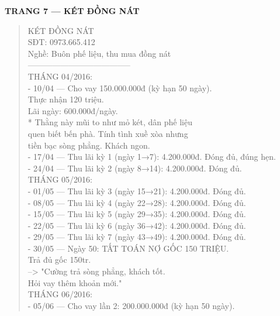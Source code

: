 \documentclass[12pt,a4paper]{article}
\begin{document}
\vspace{0.35cm}\noindent\textbf{\large TRANG 7 — KÉT ĐỒNG NÁT}\\[0.15cm]



\begin{quote}
\fontsize{9pt}{11pt}\selectfont\ttfamily
KÉT ĐỒNG NÁT\\
SĐT: 0973.665.412\\
Nghề: Buôn phế liệu, thu mua đồng nát\\
--------------------------------------\\
\vspace{0.2cm}
THÁNG 04/2016:\\
- 10/04 --- Cho vay 150.000.000đ (kỳ hạn 50 ngày).\\
          Thực nhận 120 triệu.\\
          Lãi ngày: 600.000đ/ngày.\\
          * Thằng này mũi to như mỏ két, dân phế liệu\\
            quen biết bến phà. Tính tình xuề xòa nhưng\\
            tiền bạc sòng phẳng. Khách ngon.\\
\vspace{0.2cm}
- 17/04 --- Thu lãi kỳ 1 (ngày 1→7): 4.200.000đ. Đóng đủ, đúng hẹn.\\
- 24/04 --- Thu lãi kỳ 2 (ngày 8→14): 4.200.000đ. Đóng đủ.\\
\vspace{0.2cm}
THÁNG 05/2016:\\
- 01/05 --- Thu lãi kỳ 3 (ngày 15→21): 4.200.000đ. Đóng đủ.\\
- 08/05 --- Thu lãi kỳ 4 (ngày 22→28): 4.200.000đ. Đóng đủ.\\
- 15/05 --- Thu lãi kỳ 5 (ngày 29→35): 4.200.000đ. Đóng đủ.\\
- 22/05 --- Thu lãi kỳ 6 (ngày 36→42): 4.200.000đ. Đóng đủ.\\
- 29/05 --- Thu lãi kỳ 7 (ngày 43→49): 4.200.000đ. Đóng đủ.\\
- 30/05 --- Ngày 50: TẤT TOÁN NỢ GỐC 150 TRIỆU.\\
          Trả đủ gốc 150tr.\\
          --> "Cường trả sòng phẳng, khách tốt.\\
               Hỏi vay thêm khoản mới."\\
\vspace{0.2cm}
THÁNG 06/2016:\\
- 05/06 --- Cho vay lần 2: 200.000.000đ (kỳ hạn 50 ngày).\\

\end{quote}
\end{document}
